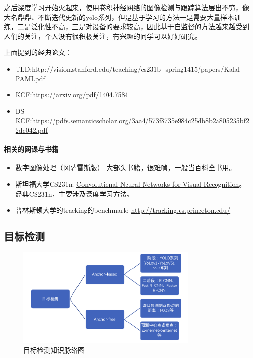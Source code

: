 \documentclass[lang=cn,11pt,a4paper]{eleganttemplate}
\begin{document}
之后深度学习开始火起来，使用卷积神经网络的图像检测与跟踪算法层出不穷，像大名鼎鼎、不断迭代更新的yolo系列，但是基于学习的方法一是需要大量样本训练，二是泛化性不高，三是对设备的要求较高，因此基于自监督的方法越来越受到人们的关注，个人没有很积极关注，有兴趣的同学可以好好研究。

上面提到的经典论文：
\begin{itemize}
    \item TLD:\href{http://vision.stanford.edu/teaching/cs231b_spring1415/papers/Kalal-PAMI.pdf}{http://vision.stanford.edu/teaching/cs231b\_spring1415/papers/Kalal-PAMI.pdf}
    \item KCF:\href{https://arxiv.org/pdf/1404.7584}{https://arxiv.org/pdf/1404.7584}
    \item DS-KCF:\href{https://pdfs.semanticscholar.org/3aa4/573f8735e984c25db8b2a805235bf22dc042.pdf}{https://pdfs.semanticscholar.org/3aa4/573f8735e984c25db8b2a805235bf22dc042.pdf}
\end{itemize}

\paragraph{相关的网课与书籍} 
\begin{itemize}
    \item 数字图像处理（冈萨雷斯版）  大部头书籍，很难啃，一般当百科全书用。
    \item 斯坦福大学CS231n: \href{http://cs231n.stanford.edu/syllabus.html}{Convolutional Neural Networks for Visual Recognition}。经典CS231n，主要涉及深度学习方法。
    \item 普林斯顿大学的tracking的benchmark: \href{http://tracking.cs.princeton.edu/}{http://tracking.cs.princeton.edu/}
\end{itemize}

\subsection{目标检测}
\begin{figure}[htbp]
  \centering
  \includegraphics[width=0.8\textwidth]{image/cv_2.png}
  \caption{目标检测知识脉络图}
\end{figure}
\end{document}
